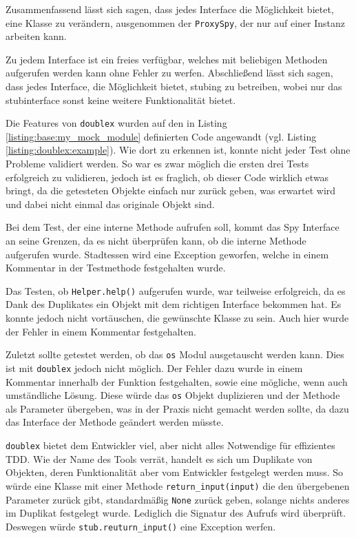 Zusammenfassend lässt sich sagen, dass jedes Interface die Möglichkeit bietet, 
eine
Klasse zu verändern, ausgenommen der \lstinline{ProxySpy}, der nur auf einer
Instanz arbeiten kann.

Zu jedem Interface ist ein freies verfügbar, welches mit beliebigen
Methoden aufgerufen werden kann ohne Fehler zu werfen. Abschließend lässt sich
sagen, dass jedes Interface, die Möglichkeit bietet,
\gls{stub}ing zu betreiben, wobei nur das \Gls{stub}interface sonst keine
weitere Funktionalität bietet.
\newline

Die Features von \lstinline{doublex} wurden auf den in Listing
\ref{listing:base:my_mock_module} definierten Code angewandt (vgl. Listing
\ref{listing:doublex:example}). Wie dort zu erkennen ist, konnte nicht jeder
Test ohne Probleme validiert werden. So war es zwar möglich die ersten drei
Tests erfolgreich zu validieren, jedoch ist es fraglich, ob dieser Code
wirklich etwas bringt, da die getesteten Objekte einfach nur zurück geben, was
erwartet wird und dabei nicht einmal das originale Objekt sind.

Bei dem Test, der eine interne Methode aufrufen soll, kommt das Spy Interface an
seine Grenzen, da es nicht überprüfen kann, ob die interne Methode aufgerufen
wurde. Stadtessen wird eine Exception geworfen, welche in einem
Kommentar in der Testmethode festgehalten wurde.

Das Testen, ob \lstinline{Helper.help()} aufgerufen wurde, war teilweise
erfolgreich, da es Dank des Duplikates ein Objekt mit dem richtigen Interface
bekommen hat. Es konnte jedoch nicht vortäuschen, die gewünschte Klasse zu sein.
Auch hier wurde der Fehler in einem Kommentar festgehalten.

Zuletzt sollte getestet werden, ob das \lstinline{os} Modul ausgetauscht werden
kann. Dies ist mit \lstinline{doublex} jedoch nicht möglich. Der Fehler
dazu wurde in einem Kommentar innerhalb der Funktion festgehalten, sowie eine
mögliche, wenn auch umständliche Lösung.
Diese würde das \lstinline{os} Objekt duplizieren und der Methode als
Parameter übergeben, was in der Praxis nicht gemacht werden
sollte, da dazu das Interface der Methode geändert werden müsste.
\newline

\lstinline{doublex} bietet dem Entwickler viel, aber nicht alles Notwendige für 
effizientes
TDD. Wie der Name des Tools verrät, handelt es sich um Duplikate von Objekten,
deren Funktionalität aber vom Entwickler festgelegt werden muss. So würde eine
Klasse mit einer Methode \lstinline{return_input(input)} die den übergebenen
Parameter zurück gibt, standardmäßig \lstinline{None} zurück geben, solange
nichts anderes im Duplikat festgelegt wurde. Lediglich die Signatur des Aufrufs
wird überprüft. Deswegen würde \lstinline{stub.reuturn_input()} eine Exception
werfen.

